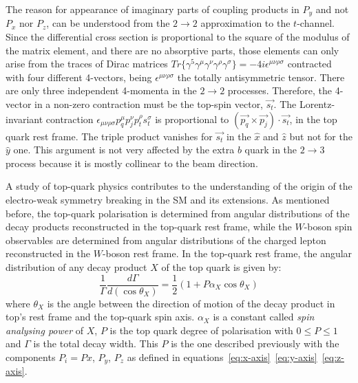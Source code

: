 The reason for appearance of imaginary parts of coupling products in $P_y$ and not $P_x$ nor $P_z$, can be understood from the $2 \rightarrow 2$ approximation to the $t$-channel. Since the differential cross section is proportional to the square of the modulus of the matrix element, and there are no absorptive parts, those elements can only arise from the traces of Dirac matrices $Tr \{ \gamma^5 \gamma^\mu \gamma^\nu \gamma^\rho \gamma^\sigma \}=-4i\epsilon^{\mu \nu \rho \sigma}$ contracted with four different 4-vectors, being $\epsilon^{\mu \nu \rho \sigma}$ the totally antisymmetric tensor. There are only three independent 4-momenta in the $2 \rightarrow 2$ processes. Therefore, the 4-vector in a non-zero contraction must be the top-spin vector, $\overrightarrow{s_t}$. The Lorentz-invariant contraction $\epsilon_{\mu \nu \rho \sigma}p_q^\mu p_j^\nu p_t^\rho s_t^\sigma$ is proportional to $(\overrightarrow{p_q} \times \overrightarrow{p_j})\cdot \overrightarrow{s_t}$, in the top quark rest frame. The triple product vanishes for $\overrightarrow{s_t}$ in the $\hat{x}$ and $\hat{z}$ but not for the $\hat{y}$ one. This argument is not very affected by the extra $b$ quark in the $2 \rightarrow 3$ process because it is mostly collinear to the beam direction.




A study of top-quark physics contributes to the understanding of the origin of the electro-weak symmetry breaking in the SM and its extensions. As mentioned before, the top-quark polarisation is determined from angular distributions of the decay products reconstructed in the top-quark rest frame, while the $W$-boson spin observables are determined from angular distributions of the charged lepton reconstructed in the $W$-boson
rest frame. 
In the top-quark rest frame, the angular distribution of any decay product $X$ of the top quark is given by:
\begin{equation} \label{eq:distrieasy}
\frac{1}{\Gamma}\frac{d\Gamma}{d(\cos \theta_X)}=\frac{1}{2} (1+P \alpha_X \cos \theta_X)
\end{equation}
where $\theta_X$ is the angle between the direction of motion of the decay product in top's rest frame and the top-quark spin axis. $\alpha_X$ is a constant called \textit{spin analysing power} of $X$, $P$ is the top quark degree of polarisation with $0 \leq P \leq 1$ and $\Gamma$ is the total decay width. This $P$ is the one described previously with the components  $P_i=Px$, $P_y$, $P_z$ as defined in equations~\eqref{eq:x-axis}~\eqref{eq:y-axis}~\eqref{eq:z-axis}.

